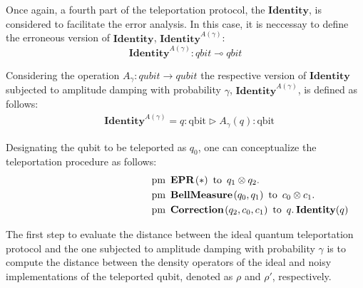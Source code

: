 Once again, a fourth part of the teleportation protocol, the $\textbf{Identity}$, is considered to facilitate the error analysis. In this case, it is neccessay to define the erroneous version of $\textbf{Identity}$, $\textbf{Identity}^{A(\gamma)}$:
\begin{equation}
  \textbf{Identity}^{A(\gamma)} : \textit{qbit}  \multimap \textit{qbit} 
\end{equation}

Considering the operation $A_{\gamma}: \textit{qubit} \xrightarrow{}  \textit{qubit}$  the respective version of $\textbf{Identity}$  subjected to amplitude damping with probability $\gamma$, $\textbf{Identity}^{A(\gamma)}$,  is defined as follows:
\begin{align}
  &\textbf{Identity}^{A(\gamma)} =  q: \text{qbit}  \triangleright  A_{\gamma} (q) : \text{qbit} 
\end{align}

Designating the qubit to be teleported as $q_0$, one can conceptualize the teleportation procedure as follows:
\begin{equation}
  \begin{split}
    \hspace{130 pt}& \text{pm} \hspace{5pt} \textbf{EPR}\hspace{1pt} (*) \hspace{5pt} \text{to} \hspace{5pt}  q_{1} \otimes q_{2}.  \notag \\
    & \text{pm}\hspace{5pt} \textbf{BellMeasure} \hspace{1pt} (q_0,q_{1}) \hspace{5pt}  \text{to} \hspace{5pt} c_{0}\otimes c_{1} . \notag \\
    & \text{pm} \hspace{5pt}  \textbf{Correction} \hspace{1pt} ( q_{2},  c_{0}, c_{1} ) \hspace{5pt} \text{to} \hspace{5pt}  q. \hspace{2pt}  \textbf{Identity}(q)
  \end{split}
\end{equation}

The first step to evaluate the distance between the ideal quantum teleportation protocol and the one subjected to amplitude damping with probability $\gamma$ is to compute the distance between the density operators of the ideal and noisy implementations of the teleported qubit, denoted as $\rho$ and $\rho'$, respectively.

